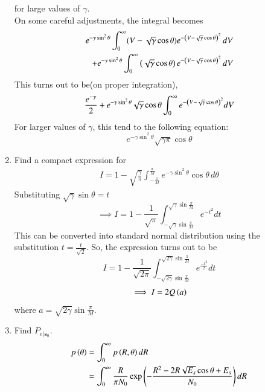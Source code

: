 \documentclass[journal,12pt,twocolumn]{IEEEtran}
\begin{document}
\begin{problem}
\begin{enumerate}
%
for large values of $\gamma$.
\\
\solution
On some careful adjustments, the integral becomes
\begin{align}
e^{-\gamma\sin^2{\theta}}\int_{0}^{\infty}(V-\sqrt{\gamma}\cos \theta)e^{{-\left(V-\sqrt{\gamma}\cos \theta\right)^2}}\,dV
\\
+e^{-\gamma\sin^2 \theta}\int_{0}^{\infty}\left(\sqrt{\gamma}\cos \theta\right) e^{{-\left(V-\sqrt{\gamma}\cos \theta\right)^2}}\,dV
\end{align}
This turns out to be(on proper integration), 
\begin{equation}
\frac{e^{-\gamma}}{2} + e^{-\gamma\sin^2 \theta} \sqrt{\gamma}\cos \theta \int_{0}^{\infty} e^{{-\left(V-\sqrt{\gamma}\cos \theta\right)^2}}dV
\end{equation}
For larger values of $\gamma$, this tend to the following equation:
\begin{equation}
e^{-\gamma\sin^2 \theta} \sqrt{\gamma\pi}\cos \theta
\end{equation}
\item
Find a compact expression for 
%
\begin{align}
I = 1 - \sqrt{\frac{\gamma}{\pi}}\int_{-\frac{\pi}{M}}^{\frac{\pi}{M}}e^{- \gamma\sin^2\theta }\cos \theta\, d\theta
\end{align}
\solution
Substituting $\sqrt{\gamma} \sin \theta = t$ 
\begin{equation}
\implies I=1-\frac{1}{\sqrt{\pi}}\int_{-\sqrt{\gamma}\sin \frac{\pi}{M}}^{\sqrt{\gamma}\sin \frac{\pi}{M}} e^{-t^2} dt
\end{equation}
This can be converted into standard normal distribution using the substitution $t=\frac{t}{\sqrt{2}}$. So, the expression turns out to be
\begin{equation}
I=1-\frac{1}{\sqrt{2\pi}}\int_{-\sqrt{2\gamma}\sin \frac{\pi}{M}}^{\sqrt{2\gamma}\sin \frac{\pi}{M}} e^{\frac{-t^2}{2}} dt
\end{equation} 
\begin{equation}
\implies I=2Q\left(a\right)
\end{equation}
where $a=\sqrt{2\gamma}\sin \frac{\pi}{M}$. 
\item Find $P_{e|\mathbf{s}_0}$.
\\
\solution
\begin{align}
p\left(\theta\right)&=\int_{0}^{\infty}p\left(R,\theta\right)dR
\\
&=\int_{0}^{\infty}\frac{R}{\pi N_0}\exp\left(-\frac{R^2-2R\sqrt{E_s}\cos \theta + E_s}{N_0}\right)dR
\end{align} 

\end{enumerate}
\end{problem}
\end{document}
